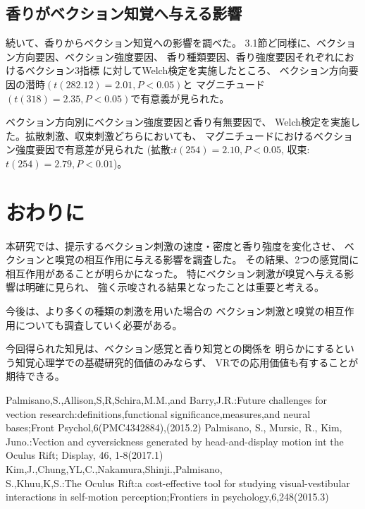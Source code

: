 \documentclass[uplatex]{jsarticle}   %
\begin{document}
\subsection{香りがベクション知覚へ与える影響}
続いて、香りからベクション知覚への影響を調べた。
3.1節ど同様に、ベクション方向要因、ベクション強度要因、
香り種類要因、香り強度要因それぞれにおけるベクション3指標
に対してWelch検定を実施したところ、
ベクション方向要因の潜時$(t(282.12)=2.01, P < 0.05)$と
マグニチュード$(t(318)=2.35, P < 0.05)$で有意義が見られた。

ベクション方向別にベクション強度要因と香り有無要因で、
Welch検定を実施した。拡散刺激、収束刺激どちらにおいても、
マグニチュードにおけるベクション強度要因で有意差が見られた
(拡散:$t(254)=2.10, P<0.05$, 収束:$t(254)=2.79, P<0.01$)。

\section{おわりに}
本研究では、提示するベクション刺激の速度・密度と香り強度を変化させ、
ベクションと嗅覚の相互作用に与える影響を調査した。
その結果、2つの感覚間に相互作用があることが明らかになった。
特にベクション刺激が嗅覚へ与える影響は明確に見られ、
強く示唆される結果となったことは重要と考える。

今後は、より多くの種類の刺激を用いた場合の
ベクション刺激と嗅覚の相互作用についても調査していく必要がある。

今回得られた知見は、ベクション感覚と香り知覚との関係を
明らかにするという知覚心理学での基礎研究的価値のみならず、
VRでの応用価値も有することが期待できる。



 \begin{thebibliography}{99}
    Palmisano,S.,Allison,S,R,Schira,M.M.,and Barry,J.R.:Future challenges for vection research:definitions,functional significance,measures,and neural bases;Front Psychol,6(PMC4342884),(2015.2)
    Palmisano, S., Mursic, R., Kim, Juno.:Vection and cyversickness generated by head-and-display motion int the Oculus Rift; Display, 46, 1-8(2017.1)
    Kim,J.,Chung,YL,C.,Nakamura,Shinji.,Palmisano,\\S.,Khuu,K,S.:The Oculus Rift:a cost-effective tool for studying visual-vestibular interactions in self-motion perception;Frontiers in psychology,6,248(2015.3)
  \end{thebibliography}
\end{document}

